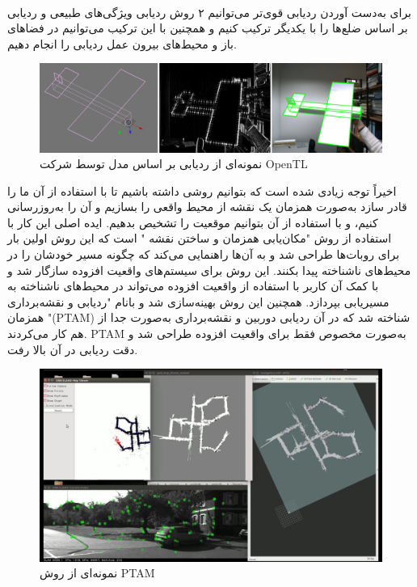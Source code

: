 \begin{itemize}
	\\
	برای به‌دست آوردن ردیابی قوی‌تر می‌توانیم ۲ روش ردیابی ویژگی‌های طبیعی و ردیابی بر اساس ضلع‌ها را با یکدیگر ترکیب کنیم\cite{vacchetti2003fusing} و همچنین با این ترکیب می‌توانیم در فضاهای باز و محیط‌های بیرون عمل ردیابی را انجام دهیم\cite{comport2006real}.
	\begin{figure}
		\centering
		\includegraphics[width=1\linewidth]{image/mbt}
		\caption {نمونه‌ای از ردیابی بر اساس مدل توسط شرکت OpenTL   \cite{mbt}}
		\label{fig:ptam}
	\end{figure}
	اخیراً توجه زیادی شده است که بتوانیم روشی داشته باشیم تا با استفاده از آن ما را قادر سازد به‌صورت همزمان یک نقشه از محیط واقعی را بسازیم و آن را به‌روزرسانی کنیم، و با استفاده از آن بتوانیم موقعیت را تشخیص بدهیم. ایده اصلی این کار با استفاده از روش "مکان‌یابی همزمان و ساختن نقشه " است که این روش اولین بار برای روبات‌ها طراحی شد\cite{dissanayake2001solution} و به آن‌ها راهنمایی می‌کند که چگونه مسیر خودشان را در محیط‌های ناشناخته پیدا بکنند. این روش برای سیستم‌های واقعیت افزوده سازگار شد و با کمک آن کاربر با استفاده از واقعیت افزوده می‌تواند در محیط‌های ناشناخته به مسیریابی بپردازد. همچنین این روش بهینه‌سازی شد و بانام "ردیابی و نقشه‌برداری همزمان "(PTAM) شناخته شد که در آن ردیابی دوربین و نقشه‌برداری به‌صورت جدا از هم کار می‌کردند. PTAM به‌صورت مخصوص فقط برای واقعیت افزوده طراحی شد و دقت ردیابی در آن بالا رفت\cite{davison2007monoslam}.
		\begin{figure}
		\centering
		\includegraphics[width=1\linewidth]{image/ptam}
		\caption {نمونه‌ای از روش PTAM    \cite{murORB2}}
		\label{fig:ptam}
	\end{figure}
	
\end{itemize}

